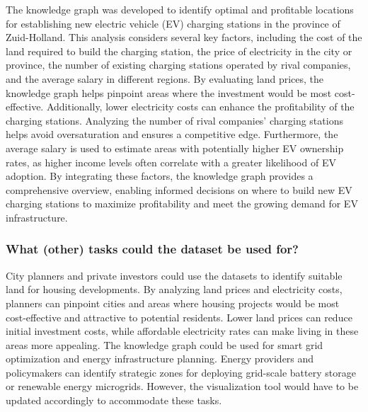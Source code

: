 \documentclass{article}
\newcommand{\question}[1]{#1}
\begin{document}
The knowledge graph was developed to identify optimal and profitable locations for establishing new electric vehicle (EV) charging stations in the province of Zuid-Holland. This analysis considers several key factors, including the cost of the land required to build the charging station, the price of electricity in the city or province, the number of existing charging stations operated by rival companies, and the average salary in different regions. By evaluating land prices, the knowledge graph helps pinpoint areas where the investment would be most cost-effective. Additionally, lower electricity costs can enhance the profitability of the charging stations. Analyzing the number of rival companies' charging stations helps avoid oversaturation and ensures a competitive edge. Furthermore, the average salary is used to estimate areas with potentially higher EV ownership rates, as higher income levels often correlate with a greater likelihood of EV adoption. By integrating these factors, the knowledge graph provides a comprehensive overview, enabling informed decisions on where to build new EV charging stations to maximize profitability and meet the growing demand for EV infrastructure.

\question{\subsubsection*{What (other) tasks could the dataset be used for?}}

City planners and private investors could use the datasets to identify suitable land for housing developments. By analyzing land prices and electricity costs, planners can pinpoint cities and areas where housing projects would be most cost-effective and attractive to potential residents. Lower land prices can reduce initial investment costs, while affordable electricity rates can make living in these areas more appealing. The knowledge graph could be used for smart grid optimization and energy infrastructure planning. Energy providers and policymakers can identify strategic zones for deploying grid-scale battery storage or renewable energy microgrids. However, the visualization tool would have to be updated accordingly to accommodate these tasks.
\end{document}
